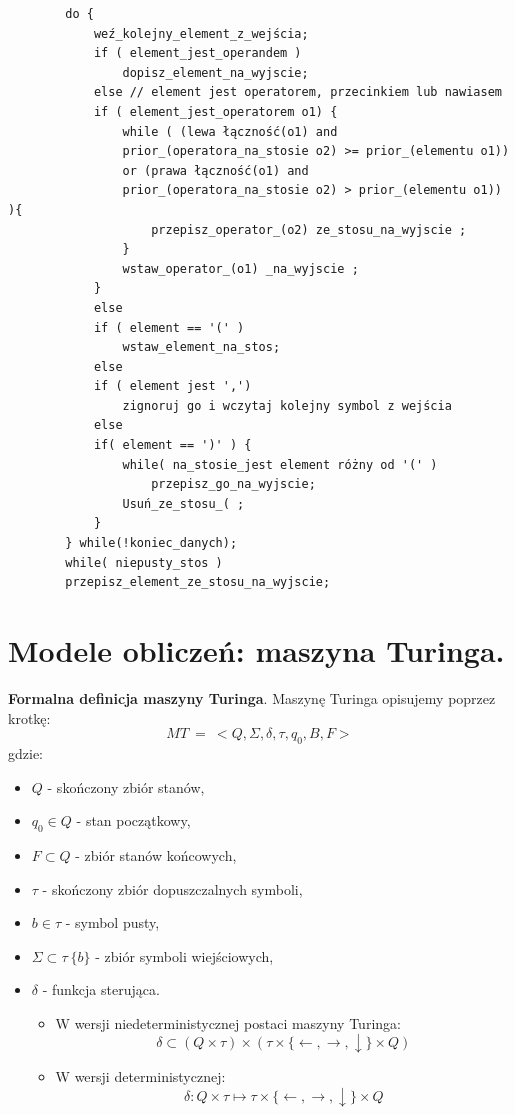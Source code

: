 \documentclass[12pt]{article}
\begin{document}
    \begin{verbatim}
        do {
            weź_kolejny_element_z_wejścia;
            if ( element_jest_operandem )
                dopisz_element_na_wyjscie;
            else // element jest operatorem, przecinkiem lub nawiasem
            if ( element_jest_operatorem o1) {
                while ( (lewa łączność(o1) and
                prior_(operatora_na_stosie o2) >= prior_(elementu o1))
                or (prawa łączność(o1) and
                prior_(operatora_na_stosie o2) > prior_(elementu o1)) ){
                    przepisz_operator_(o2) ze_stosu_na_wyjscie ;
                }
                wstaw_operator_(o1) _na_wyjscie ;
            }
            else
            if ( element == '(' )
                wstaw_element_na_stos;
            else
            if ( element jest ',')
                zignoruj go i wczytaj kolejny symbol z wejścia
            else
            if( element == ')' ) {
                while( na_stosie_jest element różny od '(' )
                    przepisz_go_na_wyjscie;
                Usuń_ze_stosu_( ;
            }
        } while(!koniec_danych);
        while( niepusty_stos )
        przepisz_element_ze_stosu_na_wyjscie;
    \end{verbatim}

    \newpage

    \section{Modele obliczeń: maszyna Turinga.}

    \begin{definition}
        \textbf{Formalna definicja maszyny Turinga}. Maszynę Turinga opisujemy poprzez krotkę:
        \[MT ~ = ~<Q, \Sigma, \delta, \tau, q_0, B, F >\]
        gdzie:
        \begin{itemize}
            \item $Q$ - skończony zbiór stanów,
            \item $q_0 \in Q$ - stan początkowy,
            \item $F \subset Q$ - zbiór stanów końcowych,
            \item $\tau$  - skończony zbiór dopuszczalnych symboli,
            \item $b \in \tau$  - symbol pusty,
            \item $\Sigma \subset \tau \ \{b\} $ - zbiór symboli wiejściowych,
            \item $\delta$ - funkcja sterująca.
            \begin{itemize}
                \item W wersji niedeterministycznej postaci maszyny Turinga:
                \[ \delta \subset (Q \times \tau)  \times (\tau \times \{\leftarrow, \rightarrow, \downarrow\}  \times Q)\]
                \item W wersji deterministycznej:
                \[ \delta : Q \times \tau \mapsto \tau \times \{\leftarrow, \rightarrow, \downarrow\} \times Q\]
            \end{itemize}
        \end{itemize}
    \end{definition}
\end{document}
